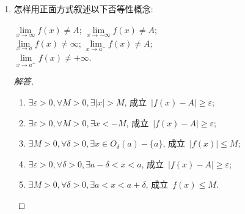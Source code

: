 \documentclass[UTF8,a4paper,11pt,twoside]{book}
\begin{document}
\begin{enumerate}
	\item 怎样用正面方式叙述以下否等性概念:
	      \begin{tabenum}[(1)]
		      \tabenumitem $\lim\limits_{x\to\infty} f(x)\neq A$;
		      \tabenumitem $\lim\limits_{x\to-\infty} f(x)\neq A$;\\
		      \tabenumitem $\lim\limits_{x\to a} f(x)\neq\infty$;
		      \tabenumitem $\lim\limits_{x\to a^{-}} f(x)\neq A$;\\
		      \tabenumitem $\lim\limits_{x\to a^{+}} f(x)\neq +\infty$.
	      \end{tabenum}
	      \begin{proof}[解答]
		      \begin{enumerate}[(1)]
			      \item $\exists\varepsilon>0, \forall M>0, \exists |x|>M$, 成立~$|f(x)-A|\geqslant\varepsilon$;
			      \item $\exists\varepsilon>0, \forall M>0, \exists x<-M$, 成立~$|f(x)-A|\geqslant\varepsilon$;
			      \item $\exists M>0, \forall\delta>0, \exists x\in O_{\delta}(a)-\{a\}$, 成立~$|f(x)|\leqslant M$;
			      \item $\exists\varepsilon>0, \forall\delta>0, \exists a-\delta<x<a$, 成立~$|f(x)-A|\geqslant\varepsilon$;
			      \item $\exists M>0, \forall\delta>0, \exists a<x<a+\delta$, 成立~$f(x)\leqslant M$. \qedhere
		      \end{enumerate}
	      \end{proof}
\end{enumerate}
\end{document}
